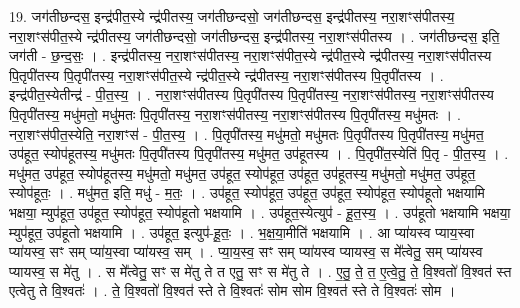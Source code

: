 \documentclass[17pt]{extarticle}
\begin{document}
19. जग॑तीछन्दस॒ इन्द्र॑पीत॒स्ये न्द्र॑पीतस्य॒ जग॑तीछन्दसो॒ जग॑तीछन्दस॒ इन्द्र॑पीतस्य॒ नरा॒शꣳस॑पीतस्य॒ नरा॒शꣳस॑पीत॒स्ये न्द्र॑पीतस्य॒ जग॑तीछन्दसो॒ जग॑तीछन्दस॒ इन्द्र॑पीतस्य॒ नरा॒शꣳस॑पीतस्य । . जग॑तीछन्दस॒ इति॒ जग॑ती - छ॒न्द॒सः॒ । . इन्द्र॑पीतस्य॒ नरा॒शꣳस॑पीतस्य॒ नरा॒शꣳस॑पीत॒स्ये न्द्र॑पीत॒स्ये न्द्र॑पीतस्य॒ नरा॒शꣳस॑पीतस्य पि॒तृपी॑तस्य पि॒तृपी॑तस्य॒ नरा॒शꣳस॑पीत॒स्ये न्द्र॑पीत॒स्ये न्द्र॑पीतस्य॒ नरा॒शꣳस॑पीतस्य पि॒तृपी॑तस्य । . इन्द्र॑पीत॒स्येतीन्द्र॑ - पी॒त॒स्य॒ । . नरा॒शꣳस॑पीतस्य पि॒तृपी॑तस्य पि॒तृपी॑तस्य॒ नरा॒शꣳस॑पीतस्य॒ नरा॒शꣳस॑पीतस्य पि॒तृपी॑तस्य॒ मधु॑मतो॒ मधु॑मतः पि॒तृपी॑तस्य॒ नरा॒शꣳस॑पीतस्य॒ नरा॒शꣳस॑पीतस्य पि॒तृपी॑तस्य॒ मधु॑मतः । . नरा॒शꣳस॑पीत॒स्येति॒ नरा॒शꣳस॑ - पी॒त॒स्य॒ । . पि॒तृपी॑तस्य॒ मधु॑मतो॒ मधु॑मतः पि॒तृपी॑तस्य पि॒तृपी॑तस्य॒ मधु॑मत॒ उप॑हूत॒ स्योप॑हूतस्य॒ मधु॑मतः पि॒तृपी॑तस्य पि॒तृपी॑तस्य॒ मधु॑मत॒ उप॑हूतस्य । . पि॒तृपी॑त॒स्येति॑ पि॒तृ - पी॒त॒स्य॒ । . मधु॑मत॒ उप॑हूत॒ स्योप॑हूतस्य॒ मधु॑मतो॒ मधु॑मत॒ उप॑हूत॒ स्योप॑हूत॒ उप॑हूत॒ उप॑हूतस्य॒ मधु॑मतो॒ मधु॑मत॒ उप॑हूत॒ स्योप॑हूतः॒ । . मधु॑मत॒ इति॒ मधु॑ - म॒तः॒ । . उप॑हूत॒ स्योप॑हूत॒ उप॑हूत॒ उप॑हूत॒ स्योप॑हूत॒ स्योप॑हूतो भक्षयामि भक्षया॒ म्युप॑हूत॒ उप॑हूत॒ स्योप॑हूत॒ स्योप॑हूतो भक्षयामि । . उप॑हूत॒स्येत्युप॑ - हू॒त॒स्य॒ । . उप॑हूतो भक्षयामि भक्षया॒ म्युप॑हूत॒ उप॑हूतो भक्षयामि । . उप॑हूत॒ इत्युप॑-हू॒तः॒ । . भ॒क्ष॒या॒मीति॑ भक्षयामि । . आ प्या॑यस्व प्याय॒स्वा प्या॑यस्व॒ सꣳ सम् प्या॑य॒स्वा प्या॑यस्व॒ सम् । . प्या॒य॒स्व॒ सꣳ सम् प्या॑यस्व प्यायस्व॒ स मे᳚त्वेतु॒ सम् प्या॑यस्व प्यायस्व॒ स मे॑तु । . स मे᳚त्वेतु॒ सꣳ स मे॑तु ते त एतु॒ सꣳ स मे॑तु ते । . ए॒तु॒ ते॒ त॒ ए॒त्वे॒तु॒ ते॒ वि॒श्वतो॑ वि॒श्वत॑ स्त एत्वेतु ते वि॒श्वतः॑ । . ते॒ वि॒श्वतो॑ वि॒श्वत॑ स्ते ते वि॒श्वतः॑ सोम सोम वि॒श्वत॑ स्ते ते वि॒श्वतः॑ सोम । \newline
\end{document}
